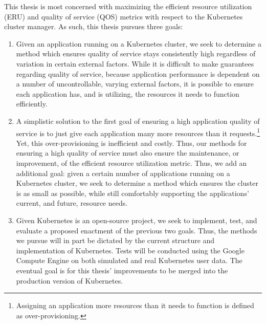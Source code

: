 This thesis is most concerned with maximizing the efficient resource utilization
(ERU) and quality of service (QOS) metrics with respect to the Kubernetes cluster manager.
As such, this thesis pursues three goals:

\begin{enumerate}
  \item Given an application running on a Kubernetes cluster, we seek to
    determine a method which ensures quality of
    service stays consistently high regardless of variation in
    certain external factors. While it is
    difficult to make guarantees regarding quality of service, because
    application performance is dependent on a number of uncontrollable, varying
    external factors, it is possible to
    ensure each application has, and is utilizing, the resources it needs to
    function efficiently.
  \item A simplistic solution to the first goal of ensuring a high application
    quality of service is to just give each application many more resources than
    it requests.\footnote{Assigning an application more resources than it needs
    to function is defined as over-provisioning.}
    Yet, this over-provisioning is inefficient and costly. Thus, our
    methods for ensuring a high quality of service must also ensure the
    maintenance, or improvement, of the efficient resource utilization metric.
    Thus, we add an additional goal: given a certain number of applications
    running on a Kubernetes cluster,
    we seek to determine a method which ensures the cluster is
    as small as possible, while still comfortably
    supporting the applications' current, and future, resource needs.
  \item Given Kubernetes is an open-source project, we seek to implement, test, and
    evaluate a proposed enactment of the previous two goals.
    Thus, the methods we pursue will
    in part be dictated by the current structure and implementation of
    Kubernetes. Tests will be conducted using the Google Compute
    Engine\cite{google-compute-engine} on both
    simulated and real Kubernetes user data. The eventual goal is for this
    thesis' improvements to be merged into the production version of Kubernetes.
\end{enumerate}

